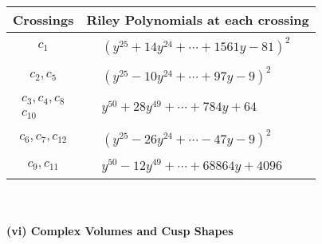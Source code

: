\documentclass[1p]{elsarticle_modified}
\theoremstyle{definition}
\begin{document}
\begin{tabular}{m{50pt}|m{274pt}}
Crossings & \hspace{64pt}Riley Polynomials at each crossing \\
\hline $$\begin{aligned}c_{1}\end{aligned}$$&$\begin{aligned}
&(y^{25}+14 y^{24}+\cdots+1561 y-81)^{2}
\end{aligned}$\\
\hline $$\begin{aligned}c_{2},c_{5}\end{aligned}$$&$\begin{aligned}
&(y^{25}-10 y^{24}+\cdots+97 y-9)^{2}
\end{aligned}$\\
\hline $$\begin{aligned}c_{3},c_{4},c_{8}\\c_{10}\end{aligned}$$&$\begin{aligned}
&y^{50}+28 y^{49}+\cdots+784 y+64
\end{aligned}$\\
\hline $$\begin{aligned}c_{6},c_{7},c_{12}\end{aligned}$$&$\begin{aligned}
&(y^{25}-26 y^{24}+\cdots-47 y-9)^{2}
\end{aligned}$\\
\hline $$\begin{aligned}c_{9},c_{11}\end{aligned}$$&$\begin{aligned}
&y^{50}-12 y^{49}+\cdots+68864 y+4096
\end{aligned}$\\
\hline
\end{tabular}\\~\\
\newpage\flushleft \textbf{(vi) Complex Volumes and Cusp Shapes}
\end{document}
